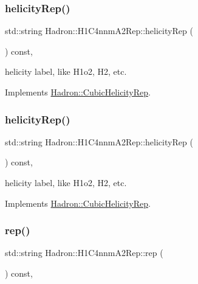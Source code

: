 \subsubsection{\texorpdfstring{helicityRep()}{helicityRep()}\hspace{0.1cm}{\footnotesize\ttfamily [2/3]}}
{\footnotesize\ttfamily std\+::string Hadron\+::\+H1\+C4nnm\+A2\+Rep\+::helicity\+Rep (\begin{DoxyParamCaption}{ }\end{DoxyParamCaption}) const\hspace{0.3cm}{\ttfamily [inline]}, {\ttfamily [virtual]}}

helicity label, like H1o2, H2, etc. 

Implements \mbox{\hyperlink{structHadron_1_1CubicHelicityRep_af1096946b7470edf0a55451cc662f231}{Hadron\+::\+Cubic\+Helicity\+Rep}}.

\mbox{\label{structHadron_1_1H1C4nnmA2Rep_abbeab2e3b048d09ea64582a68a2180a5}} 
\subsubsection{\texorpdfstring{helicityRep()}{helicityRep()}\hspace{0.1cm}{\footnotesize\ttfamily [3/3]}}
{\footnotesize\ttfamily std\+::string Hadron\+::\+H1\+C4nnm\+A2\+Rep\+::helicity\+Rep (\begin{DoxyParamCaption}{ }\end{DoxyParamCaption}) const\hspace{0.3cm}{\ttfamily [inline]}, {\ttfamily [virtual]}}

helicity label, like H1o2, H2, etc. 

Implements \mbox{\hyperlink{structHadron_1_1CubicHelicityRep_af1096946b7470edf0a55451cc662f231}{Hadron\+::\+Cubic\+Helicity\+Rep}}.

\mbox{\label{structHadron_1_1H1C4nnmA2Rep_a1f403babca36b3e12ab4f6a84e0b0bfd}} 
\subsubsection{\texorpdfstring{rep()}{rep()}\hspace{0.1cm}{\footnotesize\ttfamily [1/5]}}
{\footnotesize\ttfamily std\+::string Hadron\+::\+H1\+C4nnm\+A2\+Rep\+::rep (\begin{DoxyParamCaption}{ }\end{DoxyParamCaption}) const\hspace{0.3cm}{\ttfamily [inline]}, {\ttfamily [virtual]}}



